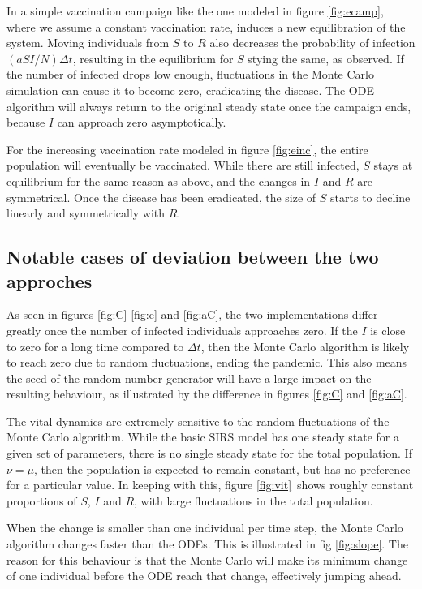 \documentclass[a4paper,10pt,twocolumn]{article}
\begin{document}
In a simple vaccination campaign like the one modeled in figure \ref{fig:ecamp}, where we assume a constant vaccination rate, induces a new equilibration of the system. Moving individuals from $S$ to $R$ also decreases the probability of infection $(aSI/N)\Delta t$, resulting in the equilibrium for $S$ stying the same, as observed.
If the number of infected drops low enough, fluctuations in the Monte Carlo simulation can cause it to become zero, eradicating the disease. 
The ODE algorithm will always return to the original steady state once the campaign ends, because $I$ can approach zero asymptotically.   

For the increasing vaccination rate modeled in figure \ref{fig:einc}, the entire population will eventually be vaccinated. While there are still infected, $S$ stays at equilibrium for the same reason as above, and the changes in $I$ and $R$ are symmetrical. Once the disease has been eradicated, the size of $S$ starts to decline linearly and symmetrically with $R$.
       

\subsection{Notable cases of deviation between the two approches}\label{ssec:dif}

As seen in figures \ref{fig:C} \ref{fig:e} and \ref{fig:aC}, the two implementations differ greatly once the number of infected individuals approaches zero. 
If the $I$ is close to zero for a long  time compared to $\Delta t$, then the Monte Carlo algorithm is likely to reach zero due to random fluctuations, ending the pandemic.
 This also means the seed of the random number generator will have a large impact on the resulting behaviour, as illustrated by the difference in figures \ref{fig:C} and \ref{fig:aC}.


The vital dynamics are extremely sensitive to the random fluctuations of the Monte Carlo algorithm. While the basic SIRS model has one steady state for a given set of parameters, there is no single steady state for the total population. If $\nu=\mu$, then the population is expected to remain constant, but has no preference for a particular value. 
In keeping with this, figure \ref{fig:vit} shows roughly constant proportions of $S$, $I$ and $R$, with large fluctuations in the total population.  


When the change is smaller than one individual per time step, the Monte Carlo algorithm changes faster than the ODEs. This is illustrated in fig \ref{fig:slope}.  
The reason for this behaviour is that the Monte Carlo will make its minimum change of one individual before the ODE reach that change, effectively jumping ahead.
\end{document}

